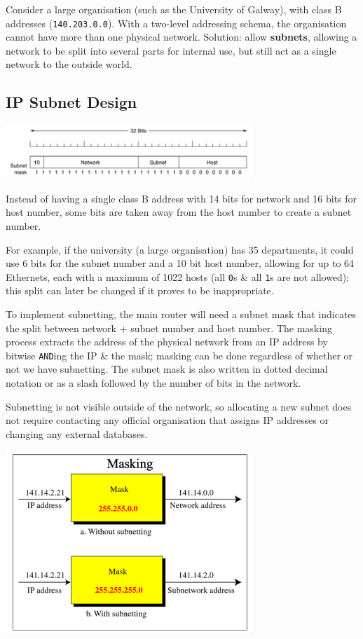 \documentclass[11pt]{article}
\begin{document}
Consider a large organisation (such as the University of Galway), with class B addresses (\verb|140.203.0.0|). 
With a two-level addressing schema, the organisation cannot have more than one physical network.
Solution: allow \textbf{subnets}, allowing a network to be split into several parts for internal use, but 
still act as a single network to the outside world.

\subsection{IP Subnet Design}
\begin{center}
    \includegraphics[width=0.7\textwidth]{subnets1.png}
\end{center}

Instead of having a single class B address with 14 bits for network and 16 bits for host number, some bits are 
taken away from the host number to create a subnet number.

For example, if the university (a large organisation) has 35 departments, it could use 6 bits for the subnet 
number and a 10 bit host number, allowing for up to 64 Ethernets, each with a maximum of 1022 hosts (all \verb|0|s 
\& all \verb|1|s are not allowed); this split can later be changed if it proves to be inappropriate.

To implement subnetting, the main router will need a subnet mask that indicates the split between network + 
subnet number and host number.
The masking process extracts the address of the physical network from an IP address by bitwise \verb|AND|ing 
the IP \& the mask; masking can be done regardless of whether or not we have subnetting.
The subnet mask is also written in dotted decimal notation or as a slash followed by the number of bits in 
the network. 

Subnetting is not visible outside of the network, so allocating a new subnet does not require contacting any official 
organisation that assigns IP addresses or changing any external databases.

\begin{center}
    \includegraphics[width=0.7\textwidth]{masking.png}
\end{center}
\end{document}
